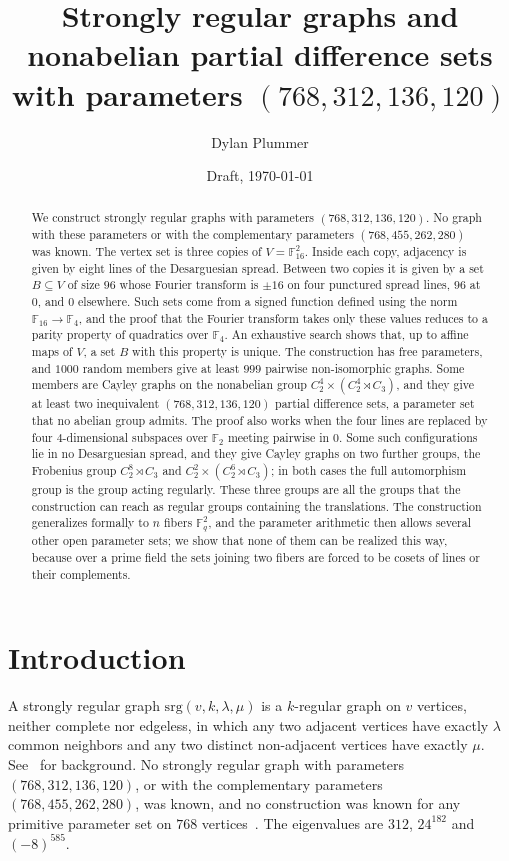 \documentclass[11pt]{amsart}
\title[Strongly regular graphs and partial difference sets on $768$ vertices]{Strongly regular graphs and nonabelian partial difference sets with parameters $(768,312,136,120)$}
\author{Dylan Plummer}
\date{Draft, \today}
\theoremstyle{definition}
\newcommand{\F}{\mathbb{F}}
\newcommand{\srg}{\mathrm{srg}}
\begin{document}
\begin{abstract}
We construct strongly regular graphs with parameters $(768,312,136,120)$. No graph with these parameters or with the complementary parameters $(768,455,262,280)$ was known. The vertex set is three copies of $V=\F_{16}^2$. Inside each copy, adjacency is given by eight lines of the Desarguesian spread. Between two copies it is given by a set $B\subseteq V$ of size $96$ whose Fourier transform is $\pm16$ on four punctured spread lines, $96$ at $0$, and $0$ elsewhere. Such sets come from a signed function defined using the norm $\F_{16}\to\F_4$, and the proof that the Fourier transform takes only these values reduces to a parity property of quadratics over $\F_4$. An exhaustive search shows that, up to affine maps of $V$, a set $B$ with this property is unique. The construction has free parameters, and $1000$ random members give at least $999$ pairwise non-isomorphic graphs. Some members are Cayley graphs on the nonabelian group $C_2^4\times(C_2^4\rtimes C_3)$, and they give at least two inequivalent $(768,312,136,120)$ partial difference sets, a parameter set that no abelian group admits. The proof also works when the four lines are replaced by four $4$-dimensional subspaces over $\F_2$ meeting pairwise in $0$. Some such configurations lie in no Desarguesian spread, and they give Cayley graphs on two further groups, the Frobenius group $C_2^8\rtimes C_3$ and $C_2^2\times(C_2^6\rtimes C_3)$; in both cases the full automorphism group is the group acting regularly. These three groups are all the groups that the construction can reach as regular groups containing the translations. The construction generalizes formally to $n$ fibers $\F_q^2$, and the parameter arithmetic then allows several other open parameter sets; we show that none of them can be realized this way, because over a prime field the sets joining two fibers are forced to be cosets of lines or their complements.
\end{abstract}

\maketitle

\section{Introduction}

A strongly regular graph $\srg(v,k,\lambda,\mu)$ is a $k$-regular graph on $v$ vertices, neither complete nor edgeless, in which any two adjacent vertices have exactly $\lambda$ common neighbors and any two distinct non-adjacent vertices have exactly $\mu$. See~\cite{BvM2022} for background. No strongly regular graph with parameters $(768,312,136,120)$, or with the complementary parameters $(768,455,262,280)$, was known, and no construction was known for any primitive parameter set on $768$ vertices~\cite{BrouwerTable}. The eigenvalues are $312$, $24^{182}$ and $(-8)^{585}$.
\end{document}

